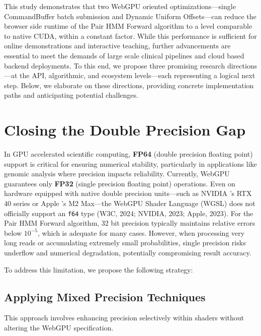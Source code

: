 \documentclass[PhD]{PHlab-thesis}
\begin{document}
This study demonstrates that two WebGPU oriented optimizations—single CommandBuffer batch submission and Dynamic Uniform Offsets—can reduce the browser side runtime of the Pair HMM Forward algorithm to a level comparable to native CUDA, within a constant factor. While this performance is sufficient for online demonstrations and interactive teaching, further advancements are essential to meet the demands of large scale clinical pipelines and cloud based backend deployments. To this end, we propose three promising research directions—at the API, algorithmic, and ecosystem levels—each representing a logical next step. Below, we elaborate on these directions, providing concrete implementation paths and anticipating potential challenges.

\section{Closing the Double Precision Gap}

In GPU accelerated scientific computing, \textbf{FP64} (double precision floating point) support is critical for ensuring numerical stability, particularly in applications like genomic analysis where precision impacts reliability. Currently, WebGPU guarantees only \textbf{FP32} (single precision floating point) operations. Even on hardware equipped with native double precision units—such as NVIDIA 's RTX 40 series or Apple 's M2 Max—the WebGPU Shader Language (WGSL) does not officially support an \texttt{f64} type (W3C, 2024; NVIDIA, 2023; Apple, 2023). For the Pair HMM Forward algorithm, 32 bit precision typically maintains relative errors below $10^{-5}$, which is adequate for many cases. However, when processing very long reads or accumulating extremely small probabilities, single precision risks underflow and numerical degradation, potentially compromising result accuracy.

To address this limitation, we propose the following strategy:

\subsection*{Applying Mixed Precision Techniques}

This approach involves enhancing precision selectively within shaders without altering the WebGPU specification.
\end{document}
